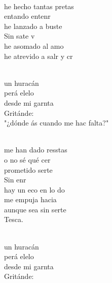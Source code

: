 \begin{cancion}[Huracán][Hakuna]%
	        \chord{(}{**)}{    }\\
	 he hecho tantas pretas\\
	entando entenr\\
	 he lanzado a buste\\
	Sin sate v\\
	 he asomado al amo\\
	he atrevido a salr y cr \\\jump\\
	\begin{chorus}%
	un huracán\\
	perá elelo \\
	desde mi garnta\\
	Gritánde:\\
	"¿dónde ás cuando me hac falta?"\\
	\end{chorus}%
	\jump\\
	me han dado resstas\\
	o no sé qué cer\\
	 prometido serte\\
	Sin enr\\
	hay un eco en lo do\\
	 me empuja hacia \\
	aunque sea sin serte\\
	Tesca. \\\jump\\
	\begin{chorus}%
	un huracán\\
	perá elelo \\
	desde mi garnta\\
	Gritánde:\\

\end{chorus}
\end{cancion}
